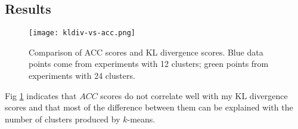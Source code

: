 \documentclass{article}
\begin{document}
\subsection{Results}

\begin{figure}[ht]
    \centering
    \texttt{[image: kldiv-vs-acc.png]}
    \caption{Comparison of ACC scores and KL divergence scores. Blue data points come from experiments with 12 clusters; green points from experiments with 24 clusters.}
    \label{kld_vs_acc}
\end{figure}

Fig \ref{kld_vs_acc} indicates that $ACC$ scores do not correlate well with my KL divergence scores and that most of the difference between them can be explained with the number of clusters produced by $k$-means.
\end{document}
